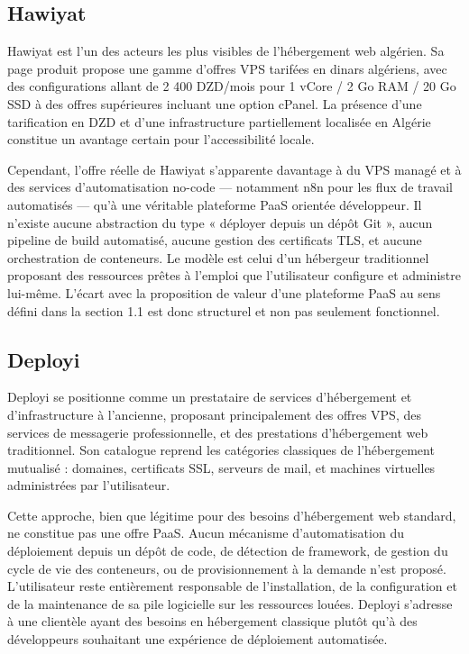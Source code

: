\subsection*{Hawiyat}

Hawiyat est l'un des acteurs les plus visibles de l'hébergement web algérien. Sa page produit propose une gamme d'offres VPS tarifées en dinars algériens, avec des configurations allant de 2 400 DZD/mois pour 1 vCore / 2 Go RAM / 20 Go SSD à des offres supérieures incluant une option cPanel. La présence d'une tarification en DZD et d'une infrastructure partiellement localisée en Algérie constitue un avantage certain pour l'accessibilité locale.

Cependant, l'offre réelle de Hawiyat s'apparente davantage à du VPS managé et à des services d'automatisation no-code — notamment n8n pour les flux de travail automatisés — qu'à une véritable plateforme PaaS orientée développeur. Il n'existe aucune abstraction du type « déployer depuis un dépôt Git », aucun pipeline de build automatisé, aucune gestion des certificats TLS, et aucune orchestration de conteneurs. Le modèle est celui d'un hébergeur traditionnel proposant des ressources prêtes à l'emploi que l'utilisateur configure et administre lui-même. L'écart avec la proposition de valeur d'une plateforme PaaS au sens défini dans la section 1.1 est donc structurel et non pas seulement fonctionnel.

\subsection*{Deployi}

Deployi se positionne comme un prestataire de services d'hébergement et d'infrastructure à l'ancienne, proposant principalement des offres VPS, des services de messagerie professionnelle, et des prestations d'hébergement web traditionnel. Son catalogue reprend les catégories classiques de l'hébergement mutualisé : domaines, certificats SSL, serveurs de mail, et machines virtuelles administrées par l'utilisateur.

Cette approche, bien que légitime pour des besoins d'hébergement web standard, ne constitue pas une offre PaaS. Aucun mécanisme d'automatisation du déploiement depuis un dépôt de code, de détection de framework, de gestion du cycle de vie des conteneurs, ou de provisionnement à la demande n'est proposé. L'utilisateur reste entièrement responsable de l'installation, de la configuration et de la maintenance de sa pile logicielle sur les ressources louées. Deployi s'adresse à une clientèle ayant des besoins en hébergement classique plutôt qu'à des développeurs souhaitant une expérience de déploiement automatisée.

